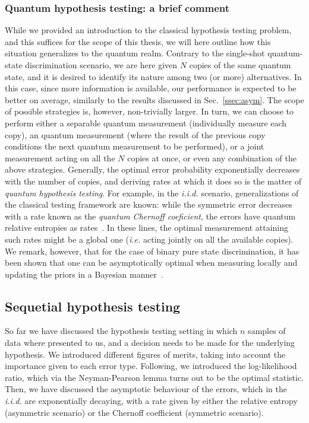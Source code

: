 \subsubsection{Quantum hypothesis testing: a brief comment}
While we provided an introduction to the classical hypothesis testing problem, and this suffices for the scope of this thesis, we will here outline how this situation generalizes to the quantum realm. Contrary to the single-shot quantum-state discrimination scenario, we are here given $N$ copies of the same quantum state, and it is desired to identify its nature among two (or more) alternatives. In this case, since more information is available, our performance is expected to be better on average, similarly to the results discussed in Sec.~\ref{ssec:asym}. The scope of possible strategies is, however, non-trivially larger. In turn, we can choose to perform either a separable quantum measurement (individually measure each copy), an  quantum measurement (where the result of the previous copy conditions the next quantum measurement to be performed), or a joint measurement acting on all the $N$ copies at once, or even any combination of the above strategies. Generally, the optimal error probability exponentially decreases with the number of copies, and deriving rates at which it does so is the matter of \textit{quantum hypothesis testing}. For example, in the \textit{i.i.d.} scenario, generalizations of the classical testing framework are known: while the symmetric error decreases with a rate known as the \textit{quantum Chernoff coeficient}\cite{Audenaert2007Discrimination}, the  errors have quantum relative entropies as rates~\cite{Hiai1991,Stein2}. In these lines, the optimal measurement attaining such rates might be a global one (\textit{i.e.} acting jointly on all the available copies). We remark, however, that for the case of binary pure state discrimination, it has been shown that one can be asymptotically optimal when measuring locally and updating the priors in a Bayesian manner~\cite{Acin2005Multi}.

\subsection{Sequetial hypothesis testing}\label{ssec:sprt}
So far we have discussed the hypothesis testing setting in which $n$ samples of data where presented to us, and a decision needs to be made for the underlying hypothesis. We introduced different figures of merits, taking into account the importance given to each error type. Following, we introduced the log-likelihood ratio, which via the Neyman-Pearson lemma turns out to be the optimal statistic. Then, we have discussed the asymptotic behaviour of the errors, which in the \textit{i.i.d.} are exponentially decaying, with a rate given by either the relative entropy (asymmetric scenario) or the Chernoff coefficient (symmetric scenario).


